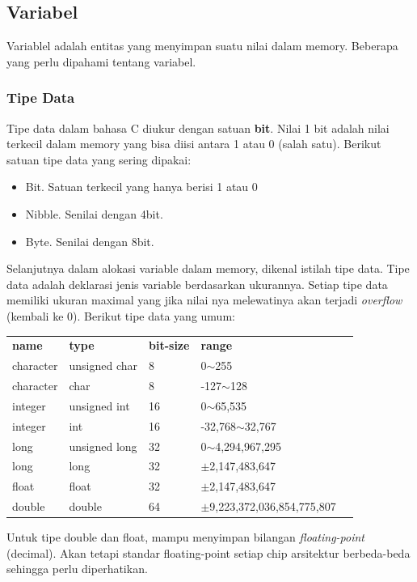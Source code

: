 \documentclass[12pt,]{article}
\begin{document}
	\newpage
	\subsection{Variabel}
	Variablel adalah entitas yang menyimpan suatu nilai dalam memory.
	Beberapa yang perlu dipahami tentang variabel.
	
	\subsubsection{Tipe Data}
	Tipe data dalam bahasa C diukur dengan satuan \textbf{bit}.
	Nilai 1 bit adalah nilai terkecil dalam memory yang bisa diisi antara 1 atau 0 (salah satu).
	Berikut satuan tipe data yang sering dipakai:
	\begin{itemize}
		\item Bit. Satuan terkecil yang hanya berisi 1 atau 0
		\item Nibble. Senilai dengan 4bit.
		\item Byte. Senilai dengan 8bit.
	\end{itemize}
	
	Selanjutnya dalam alokasi variable dalam memory, dikenal istilah tipe data.
	Tipe data adalah deklarasi jenis variable berdasarkan ukurannya.
	Setiap tipe data memiliki ukuran maximal yang jika nilai nya melewatinya akan terjadi \textit{overflow} (kembali ke 0).
	Berikut tipe data yang umum:
	\begin{table}[H]
		\begin{tabular}{|l|l|l|l|l}
			\cline{1-4}
			\textbf{name}      & \textbf{type}          & \textbf{bit-size} & \textbf{range} &  \\ \cline{1-4}
			character & unsigned char & 8  & 0$\sim$255           &  \\ \cline{1-4}
			character & char          & 8  & -127$\sim$128        &  \\ \cline{1-4}
			integer   & unsigned int  & 16 & 0$\sim$65,535        &  \\ \cline{1-4}
			integer   & int  		  & 16 & -32,768$\sim$32,767  &  \\ \cline{1-4}
			long	  & unsigned long & 32 & 0$\sim$4,294,967,295 &  \\ \cline{1-4}
			long	  & long 		  & 32 & $\pm$2,147,483,647	  &  \\ \cline{1-4}
			float	  & float 		  & 32 & $\pm$2,147,483,647	  &  \\ \cline{1-4}
			double	  & double 		  & 64 & $\pm$9,223,372,036,854,775,807	&  \\ \cline{1-4}
		\end{tabular}
	\end{table}
	Untuk tipe double dan float, mampu menyimpan bilangan \textit{floating-point} (decimal).
	Akan tetapi standar floating-point setiap chip arsitektur berbeda-beda sehingga perlu diperhatikan.
	
\end{document}
